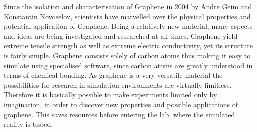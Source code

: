 
Since the isolation and characterisation of
Graphene in 2004 by Andre Geim and
Konstantin Novoselov, scientists have marvelled over the physical properties and potential
application of Graphene. Being a relatively new material, many aspects and ideas are being
investigated and researched at all times. Graphene yield extreme tensile strength as well as
extreme electric conductivity, yet its structure is fairly simple. Graphene consists solely of
carbon atoms thus making it easy to simulate using specialised software, since carbon atoms are greatly understood in terms of chemical
bonding.
As graphene is a very versatile material the possibilities for research in simulation environments are virtually limitless.
Therefore it is basically possible to make experiments limited only by imagination, in order
to discover new properties and possible applications of graphene. This saves resources
before entering the lab, where the simulated reality is tested.

